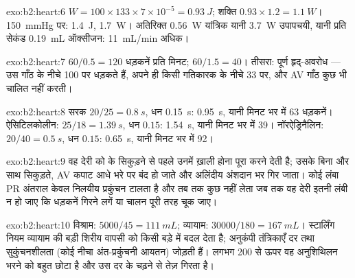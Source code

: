 \begin{solution}{exo:b2:heart:6}
$W = 100\times 133\times 7\times 10^{-5} = \qty{0.93}{J}$; शक्ति
$0.93\times 1.2 = \qty{1.1}{W}$। \qty{150}{mmHg} पर: \qty{1.4}{J},
\qty{1.7}{W}। अतिरिक्त \qty{0.56}{W} यांत्रिक यानी \qty{3.7}{W}
उपापचयी, यानी प्रति सेकंड \qty{0.19}{mL} ऑक्सीजन: \qty{11}{mL/min} अधिक।
\end{solution}

\begin{solution}{exo:b2:heart:7}
$60/0.5 = 120$ धड़कनें प्रति मिनट; $60/1.5 = 40$। तीसरा: पूर्ण
हृद्-अवरोध ---  उस गाँठ के नीचे 100 पर धड़कते हैं,  अपने ही
किसी गतिकारक के नीचे 33 पर, और AV गाँठ कुछ भी चालित नहीं करती।
\end{solution}

\begin{solution}{exo:b2:heart:8}
सरक $20/25 = \qty{0.8}{s}$, धन \qty{0.15}{s}: \qty{0.95}{s}, यानी मिनट
भर में 63 धड़कनें। ऐसिटिलकोलीन: $25/18 = \qty{1.39}{s}$, धन $0.15$:
\qty{1.54}{s}, यानी मिनट भर में 39। नॉरऐड्रिनैलिन: $20/40 = \qty{0.5}{s}$,
धन $0.15$: \qty{0.65}{s}, यानी मिनट भर में 92।
\end{solution}

\begin{solution}{exo:b2:heart:9}
वह देरी  को  के सिकुड़ने से पहले उनमें ख़ाली होना
पूरा करने देती है; उसके बिना  और  साथ
सिकुड़ते, AV कपाट आधे भरे  पर बंद हो जाते
और  अलिंदीय अंशदान भर गिर जाता।
कोई लंबा PR अंतराल केवल निलयीय प्रकुंचन टालता है
और तब तक कुछ नहीं लेता जब तक वह देरी इतनी लंबी न हो जाए कि धड़कनें
गिरने लगें या चालन पूरी तरह चूक जाए।
\end{solution}

\begin{solution}{exo:b2:heart:10}
विश्राम: $5000/45 = \qty{111}{mL}$; व्यायाम: $\num{30000}/180 =
\qty{167}{mL}$। स्टार्लिंग नियम व्यायाम की बड़ी शिरीय वापसी
को किसी बड़े  में बदल देता है; अनुकंपी तंत्रिकाएँ
दर तथा सुकुंचनशीलता (कोई नीचा अंत-प्रकुंचनी आयतन) जोड़ती हैं। लगभग
200 से ऊपर वह अनुशिथिलन  भरने को बहुत छोटा है और
 उस दर के चढ़ने से तेज़ गिरता है।
\end{solution}


